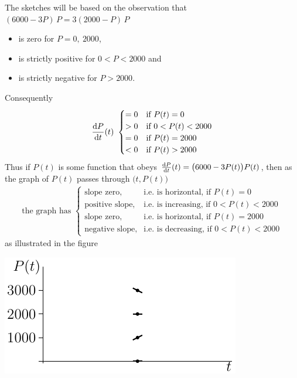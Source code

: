 \noindent The sketches will be based on the observation that
$(6000-3P)\,P=3(2000-P)\,P$
\begin{itemize} \itemsep1pt \parskip0pt
  \item is zero for $P=0,\ 2000$,
  \item is strictly positive for $0<P<2000$ and
  \item is strictly negative for $P>2000$.
\end{itemize}
Consequently
\begin{align*}
  \diff{P}{t}(t)\ \begin{cases}
                       =0  & \text{if }P(t)=0 \\
                        >0 & \text{if }0<P(t)<2000 \\
                        =0 & \text{if }P(t)=2000 \\
                        <0 & \text{if }P(t)>2000
                  \end{cases}
\end{align*}
Thus if $P(t)$ is some function that obeys
$\diff{P}{t}(t)=\big(6000-3P(t)\big)P(t)$, then as the graph of $P(t)$
passes through $\big(t,P(t)\big)$
\begin{align*}
\text{the graph has }
  \begin{cases}
      \text{slope zero,}& \text{i.e. is horizontal, \ \ if }P(t)=0  \\
      \text{positive slope,}& \text{i.e. is increasing, \ \ if }
                                                       0<P(t)<2000  \\
     \text{slope zero,}& \text{i.e. is horizontal, \ \ if }P(t)=2000  \\
          \text{negative slope,}& \text{i.e. is decreasing, \ \ if }0<P(t)<2000
  \end{cases}
\end{align*}
as illustrated in the figure
\begin{efig}
\begin{center}
  \includegraphics{pop1}
\end{center}
\end{efig}
